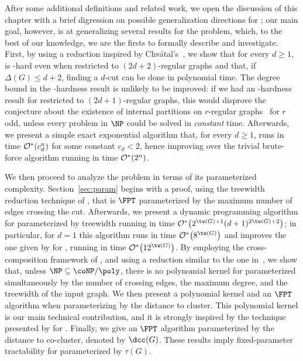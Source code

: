 After some additional definitions and related work, we open the discussion of this chapter with a brief digression on possible generalization directions for ; our main goal, however, is at generalizing several results for the  problem, which, to the best of our knowledge, we are the firsts to formally describe and investigate.
First, by using a reduction inspired by Chvátal's~\citep{chvatal_matching_cut}, we show that for every $d \geq 1$,  is \NP-hard even when restricted to $(2d+2)$-regular graphs and that, if $\Delta(G) \leq d+2$, finding a $d$-cut can be done in polynomial time. The degree bound in the \NP-hardness result is unlikely to be improved: if we had an \NP-hardness result for  restricted to $(2d+1)$-regular graphs, this would disprove the conjecture about the existence of internal partitions on $r$-regular graphs~\citep{DeVos09,internal_partition_regular6,internal_partition_regular3_4} for $r$ odd, unless every problem in $\NP$ could be solved in \textit{constant} time.
Afterwards, we present a simple exact exponential algorithm that, for every $d \geq 1$, runs in time $\mathcal{O}^*\!\left(c_d^n\right)$ for some constant $c_d < 2$, hence improving over the trivial brute-force algorithm running in time $\mathcal{O}^*\!\left(2^n\right)$.

We then proceed to analyze the problem in terms of its parameterized complexity.
Section~\ref{sec:param} begins with a proof, using the treewidth reduction technique of \citep{marx_treewidth_reduction}, that  is $\FPT$ parameterized by the maximum number of edges crossing the cut.
Afterwards, we present a dynamic programming algorithm for  parameterized by treewidth running in time $\bigOs{2^{\tw(G)+1}(d+1)^{2\tw(G) + 2}}$; in particular, for $d=1$ this algorithm runs in time $\bigOs{8^{\tw(G)}}$ and improves the one given by \cite{matching_cut_structural} for , running in time  $\bigOs{12^{\tw(G)}}$.
By employing the cross-composition framework of \cite{cross_composition}, and using a reduction similar to the one in~\citep{matching_cut_ipec}, we show that, unless $\NP \subseteq \coNP/\poly$, there is no polynomial kernel for  parameterized simultaneously by the number of crossing edges, the maximum degree, and the treewidth of the input graph.
We then present a polynomial kernel and an $\FPT$ algorithm when parameterizing by the distance to cluster.
This polynomial kernel is our main technical contribution, and it is strongly inspired by the technique presented by \cite{matching_cut_ipec} for . Finally, we give an $\FPT$ algorithm parameterized by the distance to co-cluster, denoted by $\dcc(G)$.
These results imply fixed-parameter tractability for  parameterized by $\tau(G)$.





